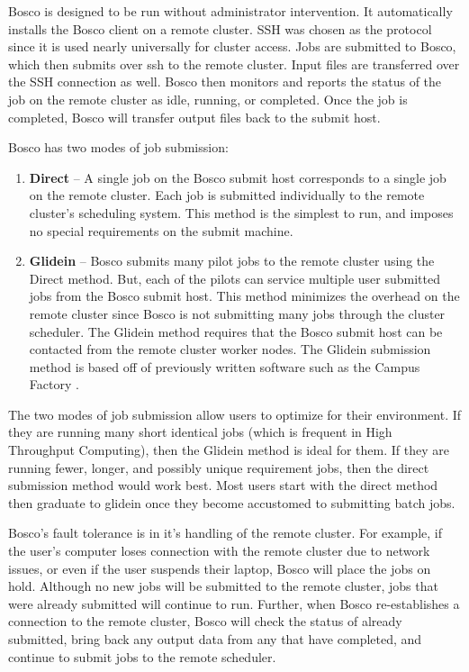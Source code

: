 Bosco is designed to be run without administrator intervention.  It automatically installs the Bosco client on a remote cluster.  SSH was chosen as the protocol since it is used nearly universally for cluster access.  Jobs are submitted to Bosco, which then submits over ssh to the remote cluster.  Input files are transferred over the SSH connection as well.  Bosco then monitors and reports the status of the job on the remote cluster as idle, running, or completed.  Once the job is completed, Bosco will transfer output files back to the submit host.

Bosco has two modes of job submission:
\begin{enumerate}
\item \textbf{Direct} -- A single job on the Bosco submit host corresponds to a single job on the remote cluster.  Each job is submitted individually to the remote cluster's scheduling system.  This method is the simplest to run, and imposes no special requirements on the submit machine.
\item \textbf{Glidein} -- Bosco submits many pilot jobs to the remote cluster using the Direct method.  But, each of the pilots can service multiple user submitted jobs from the Bosco submit host.  This method minimizes the overhead on the remote cluster since Bosco is not submitting many jobs through the cluster scheduler.  The Glidein method requires that the Bosco submit host can be contacted from the remote cluster worker nodes. \label{sec:glidein}  The Glidein submission method is based off of previously written software such as the Campus Factory \cite{weitzel2011campus}.
\end{enumerate}

The two modes of job submission allow users to optimize for their environment.  If they are running many short identical jobs (which is frequent in High Throughput Computing), then the Glidein method is ideal for them.  If they are running fewer, longer, and possibly unique requirement jobs, then the direct submission method would work best.  Most users start with the direct method then graduate to glidein once they become accustomed to submitting batch jobs.

Bosco's fault tolerance is in it's handling of the remote cluster.  For example, if the user's computer loses connection with the remote cluster due to network issues, or even if the user suspends their laptop, Bosco will place the jobs on hold.  Although no new jobs will be submitted to the remote cluster, jobs that were already submitted will continue to run.  Further, when Bosco re-establishes a connection to the remote cluster, Bosco will check the status of already submitted, bring back any output data from any that have completed, and continue to submit jobs to the remote scheduler.

